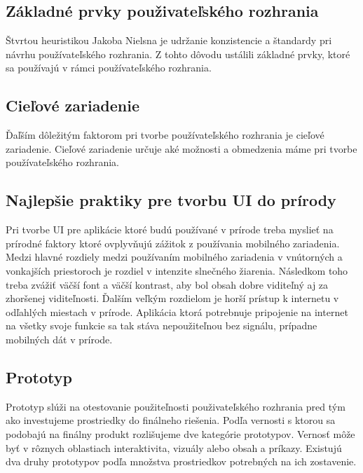 \subsection{Základné prvky použivateľského rozhrania}
Štvrtou heuristikou Jakoba Nielsna je udržanie konzistencie a štandardy pri návrhu používateľského rozhrania.
Z tohto dôvodu ustálili základné prvky, ktoré sa používajú v rámci používateľského rozhrania.


\subsection{Cieľové zariadenie}
Ďaľším dôležitým faktorom pri tvorbe používateľského rozhrania je cieľové zariadenie. Cieľové zariadenie určuje aké možnosti a obmedzenia máme pri tvorbe používateľského rozhrania. 

\subsection{Najlepšie praktiky pre tvorbu UI do prírody}
Pri tvorbe UI pre aplikácie ktoré budú používané v prírode treba myslieť na prírodné faktory ktoré ovplyvňujú zážitok z používania mobilného zariadenia. Medzi hlavné rozdiely medzi používaním mobilného zariadenia v vnútorných a vonkajších priestoroch je rozdiel v intenzite slnečného žiarenia. Následkom toho treba zvážiť väčší font a väčší kontrast, aby bol obsah dobre viditeľný aj za zhoršenej viditeľnosti. Ďalším veľkým rozdielom je horší prístup k internetu v odľahlých miestach v prírode. Aplikácia ktorá potrebnuje pripojenie na internet na všetky svoje funkcie sa tak stáva nepoužiteľnou bez signálu, prípadne mobilných dát v prírode.\cite{best_practices_outdoors}


\subsection{Prototyp}
Prototyp slúži na otestovanie použiteľnosti použivateľského rozhrania pred tým ako investujeme prostriedky do finálneho riešenia.
Podľa vernosti s ktorou sa podobajú na finálny produkt rozlišujeme dve kategórie prototypov. Vernosť môže byť v rôznych oblastiach interaktivita, vizuály alebo obsah a príkazy.
Existujú dva druhy prototypov podľa množstva prostriedkov potrebných na ich zostavenie.

